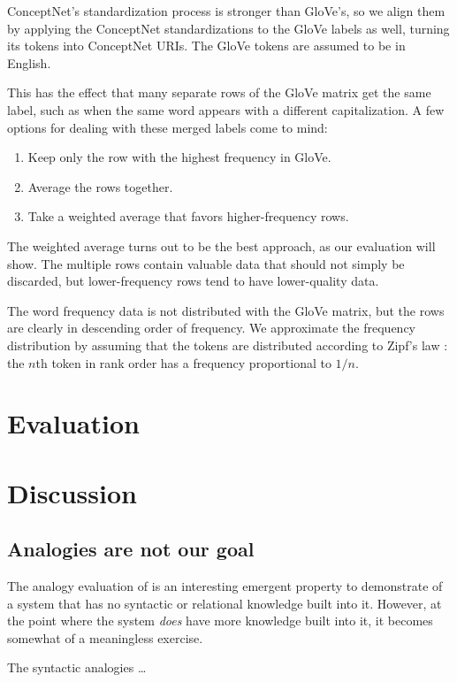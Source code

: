 \documentclass[letterpaper]{article}
\begin{document}
ConceptNet's standardization process is stronger than GloVe's, so we align them
by applying the ConceptNet standardizations to the GloVe labels as well, turning
its tokens into ConceptNet URIs. The GloVe tokens are assumed to be in English.

This has the effect that many separate rows of the GloVe matrix get the same
label, such as when the same word appears with a different capitalization. A
few options for dealing with these merged labels come to mind:

\begin{enumerate}
\item Keep only the row with the highest frequency in GloVe.
\item Average the rows together.
\item Take a weighted average that favors higher-frequency rows.
\end{enumerate}

The weighted average turns out to be the best approach, as our evaluation will
show. The multiple rows contain valuable data that should not simply be
discarded, but lower-frequency rows tend to have lower-quality data.

The word frequency data is not distributed with the GloVe matrix, but
the rows are clearly in descending order of frequency. We approximate the
frequency distribution by assuming that the tokens are distributed according to
Zipf's law \cite{TODOzipf}: the $n$th token in rank order has a frequency
proportional to $1/n$.

\section{Evaluation}


\section{Discussion}

\subsection{Analogies are not our goal}
\label{analogies-meh}

The analogy evaluation of \cite{mikolov2013word2vec} is an interesting
emergent property to demonstrate of a system that has no syntactic or
relational knowledge built into it. However, at the point where the system
{\em does} have more knowledge built into it, it becomes somewhat of
a meaningless exercise.

The syntactic analogies \ldots


\end{document}
